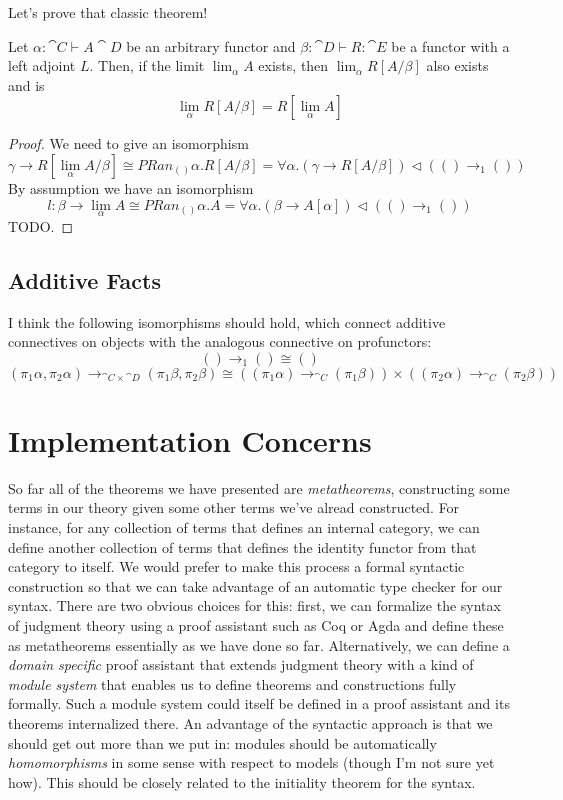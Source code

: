 \documentclass{article}
\begin{document}
Let's prove that classic theorem!

\begin{theorem}
  Let $\alpha : \cat C \vdash A \cat D$ be an arbitrary functor and
  $\beta : \cat D \vdash R : \cat E$ be a functor with a left adjoint
  $L$. Then, if the limit $\lim_\alpha A$ exists, then $\lim_\alpha
  R[A/\beta]$ also exists and is
  \[ \lim_\alpha R[A/\beta] = R[\lim_\alpha A] \]
\end{theorem}
\begin{proof}
  We need to give an isomorphism
  \[ \gamma \to R[\lim_\alpha A/\beta] \cong PRan_{()}{\alpha. R[A/\beta]} = \forall \alpha. (\gamma \to R[A/\beta]) \triangleleft (() \to_1 ()) \]
  By assumption we have an isomorphism
  \[ l : \beta \to \lim_\alpha A \cong PRan_{()}{\alpha. A} = \forall \alpha. (\beta \to A[\alpha]) \triangleleft (()\to_1 ())\]
  TODO.
\end{proof}

\subsection{Additive Facts}

I think the following isomorphisms should hold, which connect additive
connectives on objects with the analogous connective on profunctors:
\[ () \to_1 () \cong () \]
\[ (\pi_1 \alpha, \pi_2 \alpha) \to_{\cat C \times \cat D} (\pi_1 \beta, \pi_2 \beta) \cong
((\pi_1 \alpha) \to_{\cat C} (\pi_1 \beta)) \times ((\pi_2 \alpha) \to_{\cat C} (\pi_2 \beta)) \]

\section{Implementation Concerns}

So far all of the theorems we have presented are \emph{metatheorems},
constructing some terms in our theory given some other terms we've
alread constructed. For instance, for any collection of terms that
defines an internal category, we can define another collection of
terms that defines the identity functor from that category to
itself. We would prefer to make this process a formal syntactic
construction so that we can take advantage of an automatic type
checker for our syntax. There are two obvious choices for this: first,
we can formalize the syntax of judgment theory using a proof assistant
such as Coq or Agda and define these as metatheorems essentially as we
have done so far. Alternatively, we can define a \emph{domain
  specific} proof assistant that extends judgment theory with a kind
of \emph{module system} that enables us to define theorems and
constructions fully formally. Such a module system could itself be
defined in a proof assistant and its theorems internalized there. An
advantage of the syntactic approach is that we should get out more
than we put in: modules should be automatically \emph{homomorphisms}
in some sense with respect to models (though I'm not sure yet how).
This should be closely related to the initiality theorem for the
syntax.
\end{document}
